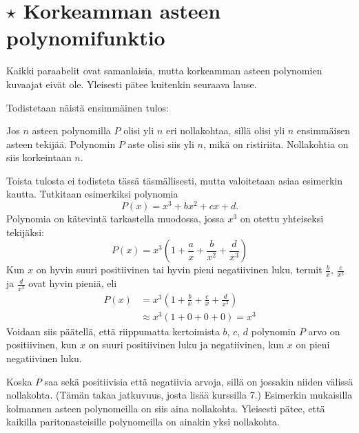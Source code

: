 \section{$\star$ Korkeamman asteen polynomifunktio}


Kaikki paraabelit ovat samanlaisia, mutta korkeamman asteen polynomien kuvaajat
eivät ole. Yleisesti pätee kuitenkin seuraava
lause.



Todistetaan näistä ensimmäinen tulos:

\begin{todistus}
Jos $n$ asteen polynomilla $P$ olisi yli $n$ eri nollakohtaa, sillä olisi yli $n$ ensimmäisen asteen
tekijää. Polynomin $P$ aste olisi siis yli $n$, mikä on ristiriita. Nollakohtia on siis
korkeintaan $n$.
\end{todistus}

Toista tulosta ei todisteta tässä täsmällisesti, mutta valoitetaan asiaa esimerkin kautta. Tutkitaan esimerkiksi polynomia 
$$P(x)=x^3+bx^2+cx+d.$$
Polynomia on kätevintä tarkastella muodossa, jossa $x^3$ on otettu yhteiseksi tekijäksi:
$$P(x) = x^3\left(1+\frac{a}{x}+\frac{b}{x^2}+\frac{d}{x^3}\right)$$
Kun $x$ on hyvin suuri positiivinen tai hyvin pieni negatiivinen luku,
termit $\frac{b}{x}$, $\frac{c}{x^2}$ ja $\frac{d}{x^3}$ ovat hyvin pieniä, eli
\begin{align*}
P(x)&= x^3\left(1+\frac{b}{x}+\frac{c}{x}+\frac{d}{x^3}\right) \\
	& \approx  x^3\left(1+0+0+0\right) = x^3
\end{align*}
Voidaan siis päätellä, että riippumatta kertoimista $b$, $c$, $d$ polynomin $P$
arvo on positiivinen, kun $x$ on suuri positiivinen luku ja negatiivinen, kun
$x$ on pieni negatiivinen luku.

Koska $P$ saa sekä positiivisia että negatiivia arvoja, sillä on jossakin niiden
välissä nollakohta. (Tämän takaa jatkuvuus, josta lisää kurssilla 7.) Esimerkin mukaisilla kolmannen asteen polynomeilla on siis aina
nollakohta. Yleisesti pätee, että kaikilla paritonasteisille polynomeilla on ainakin yksi nollakohta.

